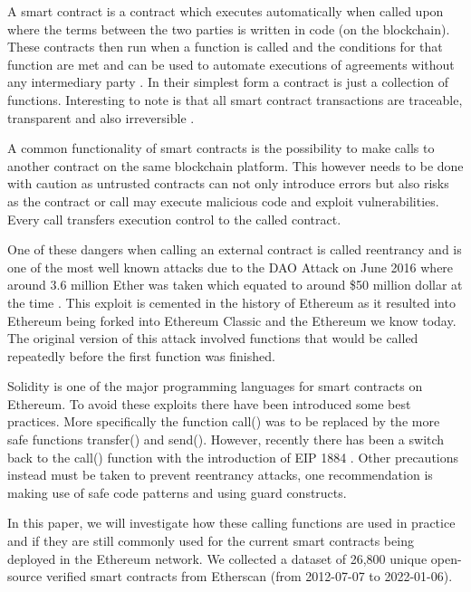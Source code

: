 \documentclass[10pt,conference]{IEEEtran}
\begin{document}
A smart contract is a contract which executes automatically when called upon where the terms between the two parties is written in code (on the blockchain). These contracts then run when a function is called and the conditions for that function are met and can be used to automate executions of agreements without any intermediary party \cite{criminal, 10.1145/2993600.2993611, smarter}. In their simplest form a contract is just a collection of functions. Interesting to note is that all smart contract transactions are traceable, transparent and also irreversible \cite{smart_inspect, smarter}.

A common functionality of smart contracts is the possibility to make calls to another contract on the same blockchain platform. This however needs to be done with caution as untrusted contracts can not only introduce errors but also risks as the contract or call may execute malicious code and exploit vulnerabilities. Every call transfers execution control to the called contract.

One of these dangers when calling an external contract is called reentrancy and is one of the most well known attacks due to the DAO Attack on June 2016 where around 3.6 million Ether was taken which equated to around \$50 million dollar at the time \cite{10.1007/978-3-662-54455-6_8}. This exploit is cemented in the history of Ethereum as it resulted into Ethereum being forked into Ethereum Classic and the Ethereum we know today. The original version of this attack involved functions that would be called repeatedly before the first function was finished. 

Solidity is one of the major programming languages for smart contracts on Ethereum. To avoid these exploits there have been introduced some best practices. More specifically the function call() was to be replaced by the more safe functions transfer() and send().  However, recently there has been a switch back to the call() function with the introduction of EIP 1884 \cite{eip1884}.  Other precautions instead must be taken to prevent reentrancy attacks, one recommendation is making use of safe code patterns and using guard constructs. 

In this paper, we will investigate how these calling functions are used in practice and if they are still commonly used for the current smart contracts being deployed in the Ethereum network.  We collected a dataset of 26,800 unique open-source verified smart contracts from Etherscan (from 2012-07-07 to 2022-01-06). 
\end{document}
